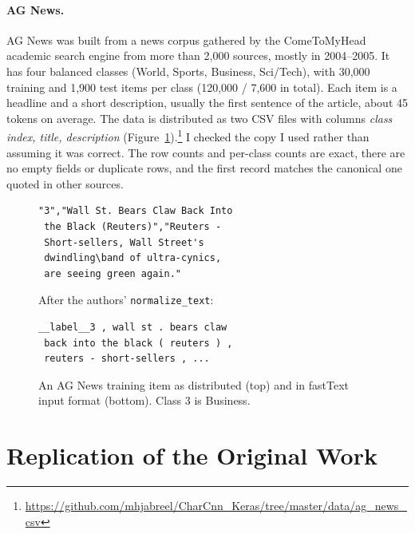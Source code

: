 \documentclass[11pt]{article}
\begin{document}
\paragraph{AG News.} AG News \citep{zhang2015character} was built from a news corpus gathered by the
ComeToMyHead academic search engine from more than 2,000 sources, mostly in 2004--2005. It has
four balanced classes (World, Sports, Business, Sci/Tech), with 30,000 training and 1,900 test
items per class (120,000 / 7,600 in total). Each item is a headline and a short description,
usually the first sentence of the article, about 45 tokens on average. The data is
distributed as two CSV files with columns \emph{class index, title, description}
(Figure~\ref{fig:agnews}).\footnote{\url{https://github.com/mhjabreel/CharCnn_Keras/tree/master/data/ag_news_csv}}
I checked the copy I used rather than assuming it was correct. The row counts and per-class
counts are exact, there are no empty fields or duplicate rows, and the first record matches
the canonical one quoted in other sources.

\begin{figure}[t]
\footnotesize
\begin{verbatim}
"3","Wall St. Bears Claw Back Into
 the Black (Reuters)","Reuters -
 Short-sellers, Wall Street's
 dwindling\band of ultra-cynics,
 are seeing green again."
\end{verbatim}
\vspace{-4pt}
After the authors' \texttt{normalize\_text}:
\begin{verbatim}
__label__3 , wall st . bears claw
 back into the black ( reuters ) ,
 reuters - short-sellers , ...
\end{verbatim}
\vspace{-6pt}
\caption{An AG News training item as distributed (top) and in fastText input format
(bottom). Class 3 is Business.}
\label{fig:agnews}
\end{figure}

\section{Replication of the Original Work}
\end{document}
